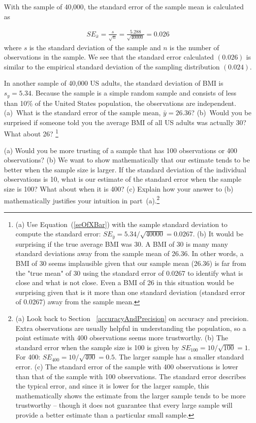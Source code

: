 With the  sample of 40,000, the standard error of the sample mean is calculated as

\begin{eqnarray*}
SE_{\bar{x}} = \frac{s}{\sqrt{n}} = \frac{5.288}{\sqrt{40000}} =  0.026
\end{eqnarray*}
where $s$ is the standard deviation of the sample and $n$ is the number of observations in the sample. We see that the standard error calculated $(0.026)$ is similar to the empirical standard deviation of the sampling distribution $(0.024)$. 

\begin{exercise}
In another sample of 40,000 US adults, the standard deviation of BMI is $s_y = 5.34$. Because the sample is a simple random sample and consists of less than 10\% of the United States population, the observations are independent. (a)~What is the standard error of the sample mean, $\bar{y}=26.36$? (b)~Would you be surprised if someone told you the average BMI of all US adults was actually 30? What about 26? \footnote{(a) Use Equation~(\ref{seOfXBar}) with the sample standard deviation to compute the standard error: $SE_{\bar{y}} = 5.34/\sqrt{40000} =  0.0267$. (b) It would be surprising if the true average BMI was 30. A BMI of 30 is many many standard deviations away from the sample mean of 26.36. In other words, a BMI of 30 seems implausible given that our sample mean (26.36) is far from the "true mean" of 30 using the standard error of 0.0267 to identify what is close and what is not close. Even a BMI of 26 in this situation would be surprising given that is it more than one standard deviation (standard error of 0.0267) away from the sample mean.}
\end{exercise}


\begin{exercise}
(a) Would you be more trusting of a sample that has 100 observations or 400 observations? (b) We want to show mathematically that our estimate tends to be better when the sample size is larger. If the standard deviation of the individual observations is 10, what is our estimate of the standard error when the sample size is 100? What about when it is 400? (c) Explain how your answer to (b) mathematically justifies your intuition in part~(a).\footnote{(a) Look back to Section ~\ref{accuracyAndPrecision} on accuracy and precision. Extra observations are usually helpful in understanding the population, so a point estimate with 400 observations seems more trustworthy. (b) The standard error when the sample size is 100 is given by $SE_{100} = 10/\sqrt{100} = 1$. For 400: $SE_{400} = 10/\sqrt{400} = 0.5$. The larger sample has a smaller standard error. (c) The standard error of the sample with 400 observations is lower than that of the sample with 100 observations. The standard error describes the typical error, and since it is lower for the larger sample, this mathematically shows the estimate from the larger sample tends to be more trustworthy -- though it does not guarantee that every large sample will provide a better estimate than a particular small sample.}
\end{exercise}

